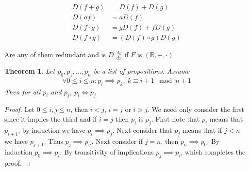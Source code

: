 \documentclass{article}
\newtheorem{theorem}{Theorem}[section]
\begin{document}
\begin{align}
    D(f+g)       &= D(f)+D(g) \\
    D(af)        &= aD(f) \\
    D(f\cdot g)  &= gD(f)+fD(g) \\
    D(f \circ g) &= (D(f) \circ g)D(g)
\end{align}

Are any of them redundant and is $D$ $\frac{dy}{dx}$ if $F$ is
$(\mathbb{R},+,\cdot)$
\begin{theorem}
	Let $p_0,p_1,\dots,p_n$ be a list of propositions. Assume
	\begin{align}
		\forall 0 \leq i \leq n: p_i \implies p_k,\ k \equiv i+1 \mod n+1
	\end{align}
	Then for all $p_i$ and $p_j$, $p_i \iff p_j$
\end{theorem}
\begin{proof}
	Let $0 \leq i,j \leq n$, then $i < j$, $i = j$ or $i > j$. We need
	only consider the first since it implies the third and if $i = j$
	then $p_i$ is $p_j$. First note that $p_i$ means that $p_{i+1}$, by
	induction we have $p_i \implies p_j $. Next consider that $p_j$ means that
	if $j < n$ we have $p_{j+1}$. Thus $p_j \implies p_n $. Next consider if $j
	=n$, then $p_n \implies p_0$. By induction $p_0 \implies p_i $. By
	transitivity of implications $p_j \implies p_i$, which completes the proof.
\end{proof}
\end{document}

